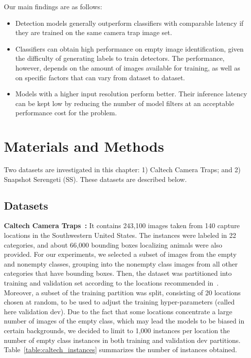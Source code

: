 Our main findings are as follows:
\begin{itemize}
 \item Detection models generally outperform classifiers with
comparable latency if they are trained on the same camera trap image set.
 \item Classifiers can obtain high performance on empty image identification,
 given the difficulty of generating labels to train
detectors. The performance, however, depends on the amount of images
available for training, as well as on specific factors that can vary from
dataset to dataset.
 \item Models with a higher input resolution perform better. Their inference
latency can be kept low by reducing the number of model filters at an
acceptable
performance cost for the problem.
\end{itemize}

\section{Materials and Methods}
Two datasets are investigated in this chapter: 1) Caltech Camera Traps; and 2)
Snapshot Serengeti (SS). These datasets are described below.

\subsection{Datasets}

\textbf{Caltech Camera Traps~\citep{beery2018recognition}:} It contains 243,100
images taken from 140 capture locations in the Southwestern United States. The
instances were labeled in 22 categories, and about 66,000 bounding boxes
localizing animals were also provided. For our experiments, we selected a
subset of images from the empty and nonempty classes, grouping into the nonempty
class images from all other categories that have bounding boxes. Then,
the dataset was partitioned into training and validation set according to the
locations recommended in~\citep{caltech_lila}. Moreover, a subset of the
training partition was split, consisting of 20 locations chosen at random, to
be used to adjust the training hyper-parameters (called here validation dev).
Due to the fact that some locations concentrate a large number of images of the
empty class, which may lead the models to be biased in certain backgrounds, we
decided to limit to 1,000 instances per location the number of empty class
instances in both training and validation dev partitions.
Table~\ref{table:caltech_instances} summarizes the number of instances obtained.

